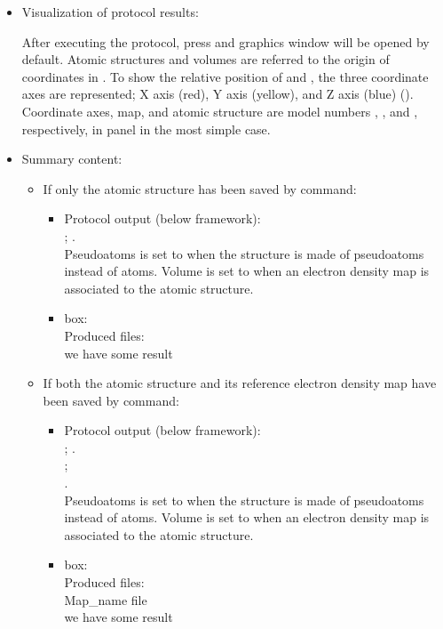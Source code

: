 \begin{itemize}
  \item Visualization of protocol results:
  
    After executing the protocol, press  and \chimera graphics window will be opened by default. Atomic structures and volumes are referred to the origin of coordinates in \chimera. To show the relative position of  and , the three coordinate axes are represented; X axis (red), Y axis (yellow), and Z axis (blue) (). Coordinate axes, map, and atomic structure are model numbers , , and , respectively, in \chimera {} panel in the most simple case.
   
  \item Summary content:
   \begin{itemize}
    \item If only the atomic structure has been saved by  command:

   \begin{itemize}
     \item Protocol output (below \scipion framework):\\ ; .\\Pseudoatoms is set to  when the structure is made of pseudoatoms instead of atoms. Volume is set to  when an electron density map is associated to the atomic structure.
     \item {} box:\\Produced files:\\we have some result
    \end{itemize}
    
   \item If both the atomic structure and its reference electron density map have been saved by  command: 
   
   \begin{itemize}
     \item Protocol output (below \scipion framework):\\
      ; .\\
      ;\\ .\\Pseudoatoms is set to  when the structure is made of pseudoatoms instead of atoms. Volume is set to  when an electron density map is associated to the atomic structure.
     \item {} box:\\Produced files:\\Map\_name file\\we have some result
    \end{itemize}
    
   \end{itemize} 
  
 \end{itemize}

